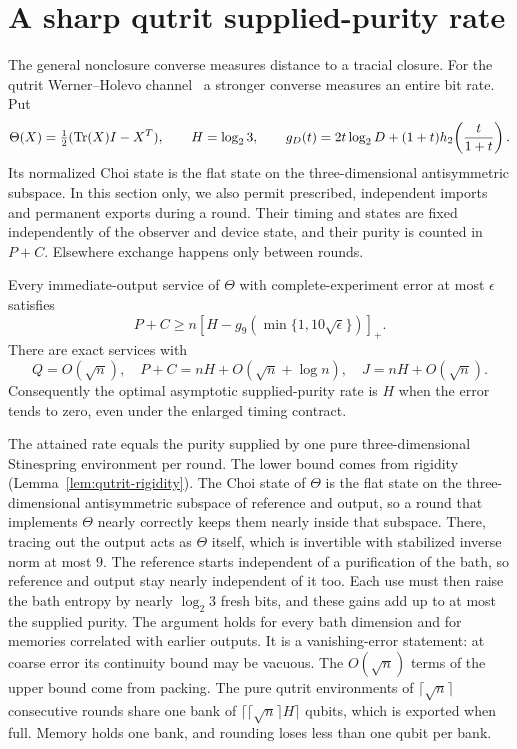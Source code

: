\section{A sharp qutrit supplied-purity rate}\label{sec:qutrit-purity}

The general nonclosure converse measures distance to a tracial closure.
For the qutrit Werner--Holevo channel~\cite{WernerHolevo2002} a stronger converse measures an
entire bit rate. Put
\[
 \Theta(X)=\tfrac12(\operatorname{Tr}(X)I-X^T),\qquad H=\log_2 3,
 \qquad g_D(t)=2t\log_2D+(1+t)h_2\!\left(\frac{t}{1+t}\right).
\]
Its normalized Choi state is the flat state on the three-dimensional
antisymmetric subspace. In this section only, we also permit prescribed,
independent imports and permanent exports during a round. Their timing
and states are fixed independently of the observer and device state,
and their purity is counted in $P+C$. Elsewhere exchange happens only
between rounds.

\begin{theorem}\label{thm:qutrit-purity}
Every immediate-output service of $\Theta$ with complete-experiment
error at most $\epsilon$ satisfies
\[
 P+C\geq n\left[H-g_9\!\left(\min\{1,10\sqrt\epsilon\}\right)\right]_+.
\]
There are exact services with
\[
 Q=O(\sqrt n),\quad P+C=nH+O(\sqrt n+\log n),
 \quad J=nH+O(\sqrt n).
\]
Consequently the optimal asymptotic supplied-purity rate is $H$ when
the error tends to zero, even under the enlarged timing contract.
\end{theorem}

The attained rate equals the purity supplied by one pure three-dimensional
Stinespring environment per round. The lower bound comes from rigidity
(Lemma~\ref{lem:qutrit-rigidity}). The Choi state of $\Theta$ is the flat
state on the three-dimensional antisymmetric subspace of reference and
output, so a round that implements $\Theta$ nearly correctly keeps them
nearly inside that subspace. There, tracing out the output acts as
$\Theta$ itself, which is invertible with stabilized inverse norm at
most $9$. The reference starts independent of a purification of the bath,
so reference and output stay nearly independent of it too. Each use must then raise the bath entropy by
nearly $\log_2 3$ fresh bits, and these gains add up to at most the
supplied purity. The argument holds for every bath dimension and for
memories correlated with earlier outputs. It is a vanishing-error
statement: at coarse error its continuity bound may be vacuous.
The $O(\sqrt n)$ terms of the upper bound come from packing. The pure
qutrit environments of $\lceil\sqrt n\rceil$ consecutive rounds share
one bank of $\lceil\lceil\sqrt n\rceil H\rceil$ qubits, which is exported
when full. Memory holds one bank, and rounding loses less than one qubit
per bank.


